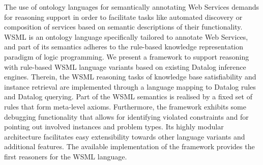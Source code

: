 The use of ontology languages for semantically annotating Web
Services demands for reasoning support in order to facilitate
tasks like automated discovery or composition of services based on
semantic descriptions of their functionality. WSML is an ontology
language specifically tailored to annotate Web Services, and part
of its semantics adheres to the rule-based knowledge
representation paradigm of logic programming. We present a
framework to support reasoning with rule-based WSML language
variants based on existing Datalog inference engines. Therein, the
WSML reasoning tasks of knowledge base satisfiability and instance
retrieval are implemented through a language mapping to Datalog
rules and Datalog querying. Part of the WSML semantics is realised
by a fixed set of rules that form meta-level axioms. Furthermore,
the framework exhibits some debugging functionality that allows
for identifying violated constraints and for pointing out involved
instances and problem types. Its highly modular architecture
facilitates easy extensibility towards other language variants and
additional features. The available implementation of the framework
provides the first reasoners for the WSML language.

